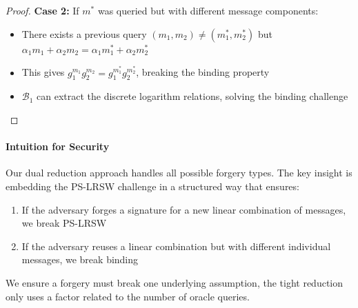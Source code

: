 \begin{proof}
\textbf{Case 2:} If $m^*$ was queried but with different message components:
\begin{itemize}
    \item There exists a previous query $(m_1, m_2) \neq (m_1^*, m_2^*)$ but $\alpha_1m_1 + \alpha_2m_2 = \alpha_1m_1^* + \alpha_2m_2^*$
    \item This gives $g_1^{m_1}g_2^{m_2} = g_1^{m_1^*}g_2^{m_2^*}$, breaking the binding property
    \item $\mathcal{B}_1$ can extract the discrete logarithm relations, solving the binding challenge
\end{itemize}
\end{proof}



\paragraph{Intuition for Security}
Our dual reduction approach handles all possible forgery types. The key insight is embedding the PS-LRSW challenge in a structured way that ensures:
\begin{enumerate}
    \item If the adversary forges a signature for a new linear combination of messages, we break PS-LRSW
    \item If the adversary reuses a linear combination but with different individual messages, we break binding
\end{enumerate}
We ensure a forgery must break one underlying assumption, the tight reduction only uses a factor related to the number of oracle queries. 

















































